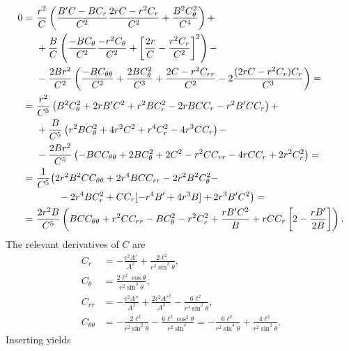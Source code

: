 \documentclass[english, parskip=full]{scrartcl}
\newcommand{\kla}{}
\newcommand{\klam}{}
\begin{document}
\begin{align*}
0 =\ &\frac{r^2}{C} \kla\left( \frac{B'C - BC_r}{C^2} \frac{2rC - r^2C_r}{C^2} + \frac{B^2C_\theta^2}{C^4} \right) + \\
&+ \frac{B}{C} \kla\left( \frac{-BC_\theta}{C^2} \frac{-r^2C_\theta}{C^2} + \klam\left[ \frac{2r}{C} - \frac{r^2C_r}{C^2} \right]^2 \right) -\\
&- \frac{2Br^2}{C^2} \kla\left( \frac{-BC_{\theta\theta}}{C^2} + \frac{2BC_\theta^2}{C^3} + \frac{2C-r^2C_{rr}}{C^2} - 2\frac{(2rC-r^2C_r) C_r}{C^3} \right) = \\
=\ & \frac{r^2}{C^5} \kla\left( B^2C_\theta^2 + 2rB'C^2 + r^2BC_r^2 - 2rBCC_r - r^2B'CC_r \right) + \\
&+ \frac{B}{C^5} \kla\left( r^2BC_\theta^2 + 4r^2C^2 + r^4C_r^2 - 4r^3CC_r \right) - \\
&- \frac{2Br^2}{C^5} \kla\left( -BCC_{\theta\theta} + 2BC_\theta^2 + 2C^2 - r^2CC_{rr} - 4rCC_r + 2r^2C_r^2 \right) = \\
= \ & \frac{1}{C^5} \big( 2r^2B^2CC_{\theta\theta} + 2r^4BCC_{rr} - 2r^2B^2C_\theta^2 - \\
&\hspace{0.8cm} -2r^4BC_r^2 + CC_r[ -r^4B' + 4r^3B ] + 2r^3B'C^2  \big) = \\
= \ & \frac{2r^2B}{C^5} \kla\left( BCC_{\theta\theta} + r^2CC_{rr} - BC_\theta^2 - r^2C_r^2 + \frac{rB'C^2}{B} + rCC_r \klam\left[ 2 - \frac{rB'}{2B} \right] \right).
\end{align*}
The relevant derivatives of $C$ are
\begin{align}
C_r &= -\frac{\epsilon^2A'}{A^2} + \frac{2\ell^2}{r^3\sin^2\theta},\\
C_\theta &= \frac{2\ell^2\cos\theta}{r^2\sin^3\theta},\\
C_{rr} &= -\frac{\epsilon^2A''}{A^2} + \frac{2\epsilon^2 A'^2}{A^3} - \frac{6\ell^2}{r^4\sin^2\theta},\\
C_{\theta\theta} &= -\frac{2\ell^2}{r^2\sin^2\theta} - \frac{6\ell^2\cos^2\theta }{r^2\sin^4} = -\frac{6\ell^2}{r^2\sin^4\theta} + \frac{4\ell^2}{r^2\sin^2\theta}.
\end{align}
Inserting yields
\end{document}
